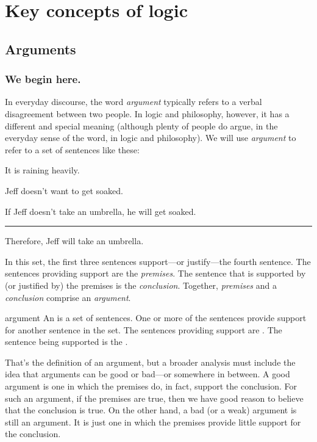\part{Key concepts of logic}
\label{ch.intro}


\chapter{Arguments}
\label{s:Arguments}

\section{We begin here.}

In everyday discourse, the word \textit{argument} typically refers to a verbal disagreement between two people. In logic and philosophy, however, it has a different and special meaning (although plenty of people do argue, in the everyday sense of the word, in logic and philosophy). We will use \textit{argument} to refer to a set of sentences like these:
	\begin{earg}\label{argRaining}
		\item[1.] It is raining heavily. 
		\item[2.] Jeff doesn't want to get soaked.
		\item[3.] If Jeff doesn't take an umbrella, he will get soaked.
		      \vspace{0.1cm}
     			\hrule
      			\vspace{0.12cm}
		\item[4.] Therefore, Jeff will take an umbrella.
	\end{earg}
In this set, the first three sentences support---or justify---the fourth sentence. The sentences providing support are the \emph{premises}. The sentence that is supported by (or justified by) the premises is the \emph{conclusion}. Together, \textit{premises} and a \textit{conclusion} comprise an \textit{argument}.  

\begin{factboxy}{argument}
An  is a set of sentences. One or more of the sentences provide support for another sentence in the set. The sentences providing support are . The sentence being supported is the .
\end{factboxy}

That's the definition of an argument, but a broader analysis must include the idea that arguments can be good or bad---or  somewhere in between. A good argument is one in which the premises do, in fact, support the conclusion. For such an argument, if the premises are true, then we have good reason to believe that the conclusion is true. On the other hand, a bad (or a weak) argument is still an argument. It is just one in which the premises provide little support for the conclusion.

